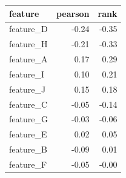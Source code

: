 \begin{tabular}{lrr}
\toprule
feature & pearson & rank \\
\midrule
feature\_D & -0.24 & -0.35 \\
feature\_H & -0.21 & -0.33 \\
feature\_A & 0.17 & 0.29 \\
feature\_I & 0.10 & 0.21 \\
feature\_J & 0.15 & 0.18 \\
feature\_C & -0.05 & -0.14 \\
feature\_G & -0.03 & -0.06 \\
feature\_E & 0.02 & 0.05 \\
feature\_B & -0.09 & 0.01 \\
feature\_F & -0.05 & -0.00 \\
\bottomrule
\end{tabular}
